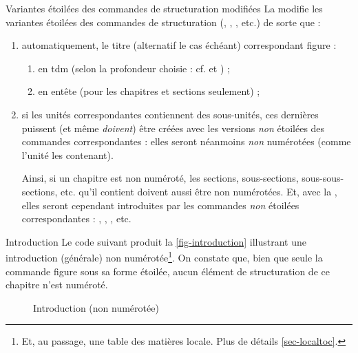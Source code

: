 \begin{dbremark}{Variantes étoilées des commandes de structuration modifiées}{}
  La \yatCl{} modifie les variantes étoilées des commandes de structuration
  (, ,
  , etc.) de sorte que :
  \begin{enumerate}
  \item automatiquement, le titre (alternatif le cas échéant) correspondant
    figure :
    \begin{enumerate}
    \item en \gls{tdm} (selon la profondeur choisie : cf.  et
      ) ;
    \item en entête (pour les chapitres et sections seulement) ;
    \end{enumerate}
  \item si les unités correspondantes contiennent des sous-unités, ces dernières
    puissent (et même \emph{doivent}) être créées avec les versions \emph{non}
    étoilées des commandes correspondantes : elles seront néanmoins \emph{non}
    numérotées (comme l'unité les contenant).

    Ainsi, si un chapitre est non numéroté, les sections, sous-sections,
    sous-sous-sections, etc. qu'il contient doivent aussi être non
    numérotées. Et, avec la \yatCl{}, elles seront cependant introduites par les
    commandes \emph{non} étoilées correspondantes : ,
    , , etc.
  \end{enumerate}
\end{dbremark}

\begin{dbexample}{Introduction}{}
  Le code suivant produit la \vref{fig-introduction} illustrant une introduction
  (générale) non numérotée\footnote{Et, au passage, une table des matières
    locale. Plus de détails \vref{sec-localtoc}.}. On constate que, bien que
  seule la commande  figure sous sa forme étoilée, aucun
  élément de structuration de ce chapitre n'est numéroté.
\end{dbexample}

\begin{figure}[p]
  \centering
  \caption{Introduction (non numérotée)}
  \label{fig-introduction}
\end{figure}


